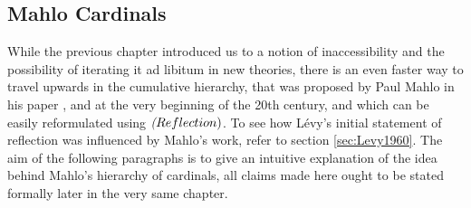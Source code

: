 \documentclass[12pt,a4paper]{article}
\newcommand{\power}[1]{\ensuremath{\mathscr{P}} (#1)}
\newcommand{\then}{\rightarrow}
\begin{document}
{\begin{comment}
 The next part, proving $(iii) \then (ii)$, should be elementary since $C$ is closed unbounded, which means that it contains at least countably many elements but we need only one such $\alpha$ to satisfy (\ref{def:reflection_2}).
 \newline
 Finally, we shall prove that $(ii) \then (i)$. Since it obviously holds that $\kappa > \omega$, we have yet to prove that $\kappa$ is regular and a~strong limit. Let's argue by contradiction that it is regular. 
 If it wasn't, there would be a~$\beta < \kappa$ and a~function $F: \beta \implies \kappa$ with range unbounded in $\kappa$. Set $R = \{\beta\} \cup F$. By hypothesis there is an $\alpha < \kappa$ such that $\langle V_\alpha, \in, R \cap V_\alpha \rangle \prec \langle V_\kappa, \in, R \rangle$. Since $\beta$ is the single ordinal in R, $\beta \in V_\alpha$ by elementarity. This yields the desired contradiction since the domain if $F \cap V_\alpha$ cannot be all of $\beta$.
 \newline\newline
 Next, let's see whether $\kappa$ is indeed a~strong limit, again by contradiction. If not, there would be a~$\lambda < \kappa$ such that $2^\lambda \geq \kappa$. Let $G: \power{\lambda} \implies \kappa$ be surjective and set $R = \{\lambda + 1\} \cup G$. By hypothesis, there is an $\alpha < \kappa$ such that $\langle V_\alpha, \in, R \cap V_\alpha \rangle \prec \langle V_\kappa, \in, R \rangle$. $\lambda + 1 \in V_\alpha$ and so $\power{\lambda} \in V_\alpha$, but this is again a~contradiction.
\end{proof}

\

\end{comment}
}

%
%

\subsection{Mahlo Cardinals}

While the previous chapter introduced us to a notion of inaccessibility and the possibility of iterating it ad libitum in new theories, there is an even faster way to travel upwards in the cumulative hierarchy, that was proposed by Paul Mahlo in his paper \cite{Mahlo11}, \cite{Mahlo12} and \cite{Mahlo13} at the very beginning of the 20th century, and which can be easily reformulated using $\emph(Reflection)$. To see how Lévy's initial statement of reflection was influenced by Mahlo's work, refer to section \ref{sec:Levy1960}. The aim of the following paragraphs is to give an intuitive explanation of the idea behind Mahlo's hierarchy of cardinals, all claims made here ought to be stated formally later in the very same chapter.
\end{document}
